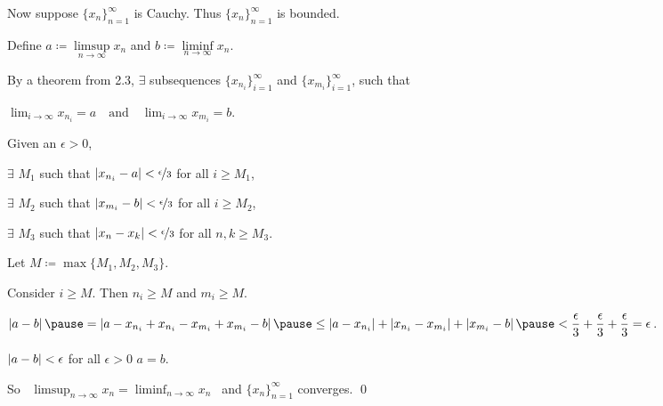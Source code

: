 \documentclass[10pt,aspectratio=169]{beamer}
\begin{document}
\begin{frame}

Now suppose $\{ x_n \}_{n=1}^\infty$ is Cauchy.  \pause Thus
$\{x_n\}_{n=1}^\infty$ is bounded.

\pause
\medskip

Define $a \coloneqq \limsup\limits_{n\to \infty} x_n$ and
$b \coloneqq \liminf\limits_{n\to \infty} x_n$.

\pause
By a theorem from 2.3, $\exists$ subsequences
$\{ x_{n_i} \}_{i=1}^\infty$ and
$\{ x_{m_i} \}_{i=1}^\infty$, such that

$\displaystyle
\lim_{i\to\infty} x_{n_i} = a
\quad \text{and} \quad
\lim_{i\to\infty} x_{m_i} = b$.

\pause
\medskip

Given an $\epsilon > 0$,

\pause
$\exists$
$M_1$ such that
$\left\lvert {x_{n_i} - a} \right\rvert < \nicefrac{\epsilon}{3}$ for all $i \geq M_1$,

\pause
$\exists$
$M_2$ such that
$\left\lvert {x_{m_i} - b} \right\rvert < \nicefrac{\epsilon}{3}$ for all $i \geq M_2$,

\pause
$\exists$
$M_3$ such that
$\left\lvert {x_n-x_k} \right\rvert < \nicefrac{\epsilon}{3}$ for all $n,k \geq M_3$.

\pause
Let $M \coloneqq \max \{ M_1, M_2, M_3 \}$.

\pause
\medskip

Consider $i \geq M$. \pause  Then $n_i \geq M$ and $m_i \geq M$.

\pause
\medskip

$\displaystyle
\abs{a-b}
\pause
=
\abs{a-x_{n_i}+x_{n_i}
-x_{m_i}+x_{m_i}
-b} 
%
\pause
%
\leq
\abs{a-x_{n_i}}
+ \abs{x_{n_i} -x_{m_i}}
+ \abs{x_{m_i} -b} 
\pause
 <
\frac{\epsilon}{3}
+
\frac{\epsilon}{3}
+
\frac{\epsilon}{3}
= \epsilon$.

\pause
\medskip

$\left\lvert {a-b} \right\rvert < \epsilon$ for all $\epsilon > 0$ \wthus $a=b$.

\pause
\medskip

So ~$\displaystyle \limsup_{n\to\infty} x_n = \liminf_{n\to\infty} x_n$~ and
$\{ x_n \}_{n=1}^\infty$ converges.
\qed

\end{frame}
\end{document}
